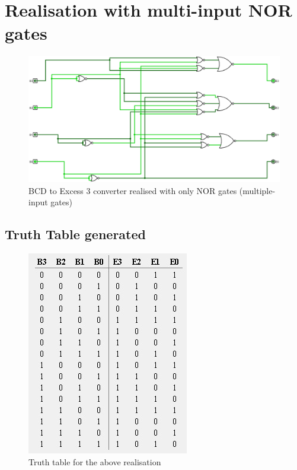 \documentclass[12pt]{article}
\begin{document}
\section{Realisation with multi-input NOR gates}
\begin{center}
    \begin{figure}[ht]
        \includegraphics[scale=0.30]{onlynors.png}
        \caption{BCD to Excess 3 converter realised with only NOR gates (multiple-input gates)}
    \end{figure}
\end{center}
\newpage
\subsection{Truth Table generated}
\begin{center}
    \begin{figure}[ht]
        \includegraphics{ttonlynors.jpg}
        \caption{Truth table for the above realisation}
    \end{figure}
\end{center}
\end{document}
